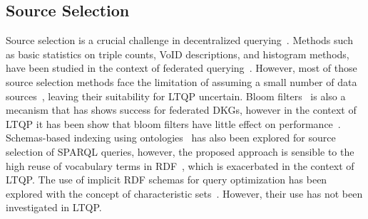 \subsection{Source Selection}
Source selection is a crucial challenge in decentralized querying~\cite{hose2012towards, Harth2010}.
Methods such as basic statistics on triple counts, VoID descriptions, and histogram methods, have been studied in the context of federated querying~\cite{hose2012towards, Harth2010, Montoya2017}.
However, most of those source selection methods face the limitation of assuming a small number of data sources~\cite{Harth2010}, leaving their suitability for LTQP uncertain.
Bloom filters~\cite{dia2018fast} is also a mecanism that has shows success for federated DKGs, however in the context of LTQP it has been show that bloom filters have little effect on performance~\cite{Hanski2024}.
Schemas-based indexing using ontologies~\cite{Stuckenschmidt2004} has also been explored for source selection of SPARQL queries,
however, the proposed approach is sensible to the high reuse of vocabulary terms in RDF~\cite{Harth2010}, which is exacerbated in the context of LTQP.
The use of implicit RDF schemas for query optimization has been explored with the concept of characteristic sets~\cite{Neumann2011CharacteristicSA, Meimaris2017ExtendedCS, Montoya2017}.
However, their use has not been investigated in LTQP.